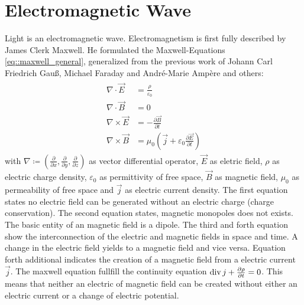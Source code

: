 \section{Electromagnetic Wave}
% 
Light is an electromagnetic wave. Electromagnetism is first fully described by James Clerk Maxwell. He formulated the Maxwell-Equations \cref{eq::maxwell_general}, generalized from the previous work of Johann Carl Friedrich Gau{\ss}, Michael Faraday and Andr\'{e}-Marie Amp\`{e}re and others:
% 
% 
\begin{align} 
\begin{split} \label{eq::maxwell_general}
    \nabla \cdot \vec{E} &= \frac {\rho} {\varepsilon_0}\\
    \nabla \cdot \vec{B} &= 0\\
    \nabla \times \vec{E} &= -\frac{\partial \vec{B}} {\partial t}\\
    \nabla \times \vec{B} &= \mu_0\left(\vec{j} + \varepsilon_0 \frac{\partial \vec{E}} {\partial t} \right)
\end{split}
\end{align}
% 
with $\nabla \coloneqq \left({\frac{\partial}{\partial x}}, {\frac{\partial}{\partial y}}, {\frac{\partial}{\partial z}} \right)$ as vector differential operator, $\vec{E}$ as eletric field, $\rho$ as electric charge density, $\varepsilon_0$ as permittivity of free space, $\vec{B}$ as magnetic field, $\mu_0$ as permeability of free space and $\vec{j}$ as electric current density.
% 
The first equation states no electric field can be generated without an electric charge (charge conservation).
The second equation states, magnetic monopoles does not exists. The basic entity of an magnetic field is a dipole.
The third and forth equation show the interconnection of the electric and magnetic fields in space and time.
A change in the electric field yields to a magnetic field and vice versa.
Equation forth additional indicates the creation of a magnetic field from a electric current $\vec{j}$.
The maxwell equation fullfill the continuity equation $\operatorname{div} j + \frac{\partial \rho}{\partial t} = 0$.
This means that neither an electric of magnetic field can be created without either an electric current or a change of electric potential.
%
% 
